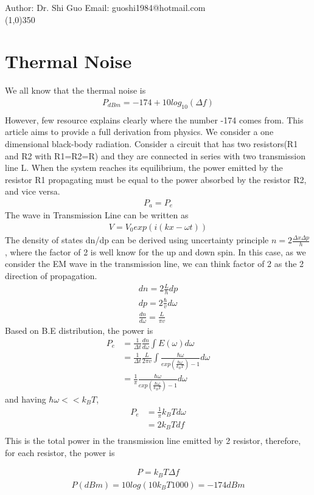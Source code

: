 \documentclass[a4paper]{article}
\begin{document}
Author: Dr. Shi Guo  \hspace{30mm} Email: guoshi1984@hotmail.com\\
\line(1,0){350}
\section{Thermal Noise}
We all know that the thermal noise is
\begin{align*}
	P_{dBm} = -174 + 10 log_{10}(\Delta f) \\
\end{align*}
However, few resource explains clearly where the number -174 comes from. This article aims to provide a full derivation from physics. We consider a one dimensional black-body radiation. Consider a circuit that has two resistors(R1 and R2 with R1=R2=R) and they are connected in series with two transmission line L.  When the system reaches its equilibrium, the power emitted by the resistor R1 propagating  must be equal to the power absorbed by the resistor R2, and vice versa. 
\begin{align*}
	P_a = P_e
\end{align*}
The wave in Transmission Line can be written as 
\begin{align*}
	V = V_0 exp(i(kx - \omega t))
\end{align*}
The density of states dn/dp can be derived using uncertainty principle $n = 2\frac{\Delta x \Delta p}{h}$,
where the factor of 2 is well know for the up and down spin. In this case, as we consider the EM wave in the transmission line, we can think factor of 2 as the 2 direction of propagation. 
\begin{align*}
	dn = 2\frac{L}{h}dp\\
	dp = 2\frac{\hbar}{v} d \omega \\
	\frac{d n}{d \omega} =\frac{L}{\pi v}
\end{align*}
Based on B.E distribution, the power is
\begin{align*}
	P_e & = \frac{1}{\Delta t} \frac{dn}{d \omega} \int E(\omega) d \omega \\
	& = \frac{1}{\Delta t} \frac{L}{2 \pi v} \int \frac{\hbar \omega}{exp( \frac{\hbar \omega}{k_B T})-1} d \omega \\
	& = \frac{1}{\pi} \frac{\hbar \omega}{exp( \frac{\hbar \omega}{k_B T})-1} d \omega
\end{align*}
and having $\hbar \omega << k_B T$,
\begin{align*}
	P_e	& = \frac{1}{ \pi} k_B T d \omega\\
	    & = 2 k_B T df\\
\end{align*}
This is the total power in the transmission line emitted by 2 resistor, therefore, for each resistor, the power is

\begin{align*}
	P = k_B T \Delta f
\end{align*}
\begin{align*}
	P(dBm) = 10 log (10 k_B T 1000) = -174dBm 
\end{align*}
\end{document}
